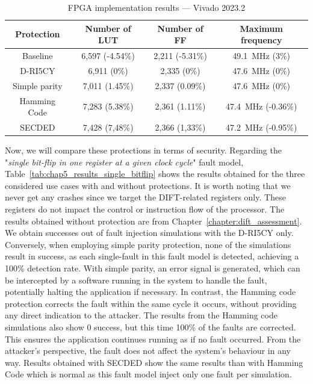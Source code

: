 \begin{table}[t]
    \footnotesize
    \centering
    \caption{FPGA implementation results — Vivado 2023.2}
    \label{tab:chap5_implementation}
    \setlength{\tabcolsep}{3pt}
    \begin{tabular}{@{}c|ccc@{}}
        \toprule
        Protection    & Number of LUT   & Number of FF    & Maximum frequency                \\ \midrule
        Baseline      & 6,597 (-4.54\%) & 2,211 (-5.31\%) & \SI{49.1}{\mega\hertz} (3\%)     \\
        D-RI5CY       & 6,911 (0\%)     & 2,335 (0\%)     & \SI{47.6}{\mega\hertz} (0\%)     \\
        Simple parity & 7,011 (1.45\%)  & 2,337 (0.09\%)  & \SI{47.6}{\mega\hertz} (0\%)     \\
        Hamming Code  & 7,283 (5.38\%)  & 2,361 (1.11\%)  & \SI{47.4}{\mega\hertz} (-0.36\%) \\
        SECDED        & 7,428 (7,48\%)  & 2,366 (1,33\%)  & \SI{47.2}{\mega\hertz} (-0.95\%) \\
        \bottomrule
    \end{tabular}
\end{table}

Now, we will compare these protections in terms of security.
Regarding the "\textit{single bit-flip in one register at a given clock cycle}" fault model, Table~\ref{tab:chap5_results_single_bitflip} shows the results obtained for the three considered use cases with and without protections. It is worth noting that we never get any crashes since we target the DIFT-related registers only. These registers do not impact the control or instruction flow of the processor.
The results obtained without protection are from Chapter~\ref{chapter:dift_assessment}. We obtain  successes out of  fault injection simulations with the D-RI5CY only.
Conversely, when employing simple parity protection, none of the  simulations result in success, as each single-fault in this fault model is detected, achieving a 100\% detection rate. With simple parity, an error signal is generated, which can be intercepted by a software running in the system to handle the fault, potentially halting the application if necessary. In contrast, the Hamming code protection corrects the fault within the same cycle it occurs, without providing any direct indication to the attacker. The results from the Hamming code simulations also show 0 success, but this time 100\% of the faults are corrected. This ensures the application continues running as if no fault occurred. From the attacker’s perspective, the fault does not affect the system’s behaviour in any way.
Results obtained with SECDED show the same results than with Hamming Code which is normal as this fault model inject only one fault per simulation.

